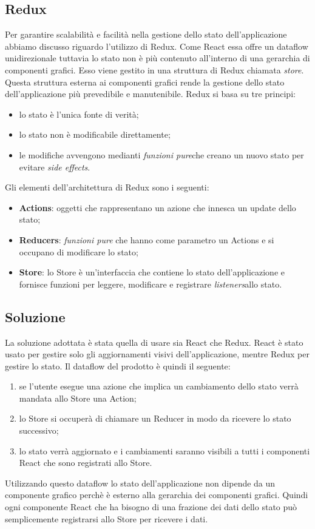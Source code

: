 \subsection{Redux}
Per garantire scalabilità e facilità nella gestione dello stato dell'applicazione abbiamo discusso riguardo l'utilizzo di Redux. Come React essa offre un dataflow unidirezionale tuttavia lo stato non è più contenuto all'interno di una gerarchia di componenti grafici. Esso viene gestito in una struttura di Redux chiamata \emph{store}. Questa struttura esterna ai componenti grafici rende la gestione dello stato dell'applicazione più prevedibile e manutenibile. Redux si basa su tre principi:
\begin{itemize}
	\item lo stato è l'unica fonte di verità;
	\item lo stato non è modificabile direttamente;
	\item le modifiche avvengono medianti \emph{funzioni pure}\glosp che creano un nuovo stato per evitare \emph{side effects}\glo.
\end{itemize}
\noindent
Gli elementi dell'architettura di Redux sono i seguenti:
\begin{itemize}
	\item \textbf{Actions}: oggetti che rappresentano un azione che innesca un update dello stato;
	\item \textbf{Reducers}: \emph{funzioni pure} che hanno come parametro un Actions e si occupano di modificare lo stato;
	\item \textbf{Store}: lo Store è un'interfaccia che contiene lo stato dell'applicazione e fornisce funzioni per leggere, modificare e registrare \emph{listeners}\glosp allo stato.
\end{itemize}
\noindent

\subsection{Soluzione}
La soluzione adottata è stata quella di usare sia React che Redux. React è stato usato per gestire solo gli aggiornamenti visivi dell'applicazione, mentre Redux per gestire lo stato. Il dataflow del prodotto è quindi il seguente:
\begin{enumerate}
	\item se l'utente esegue una azione che implica un cambiamento dello stato verrà mandata allo Store una Action;
	\item lo Store si occuperà di chiamare un Reducer in modo da ricevere lo stato successivo;
	\item lo stato verrà aggiornato e i cambiamenti saranno visibili a tutti i componenti React che sono registrati allo Store.
\end{enumerate}
Utilizzando questo dataflow lo stato dell'applicazione non dipende da un componente grafico perchè è esterno alla gerarchia dei componenti grafici. Quindi ogni componente React che ha bisogno di una frazione dei dati dello stato può semplicemente registrarsi allo Store per ricevere i dati.

